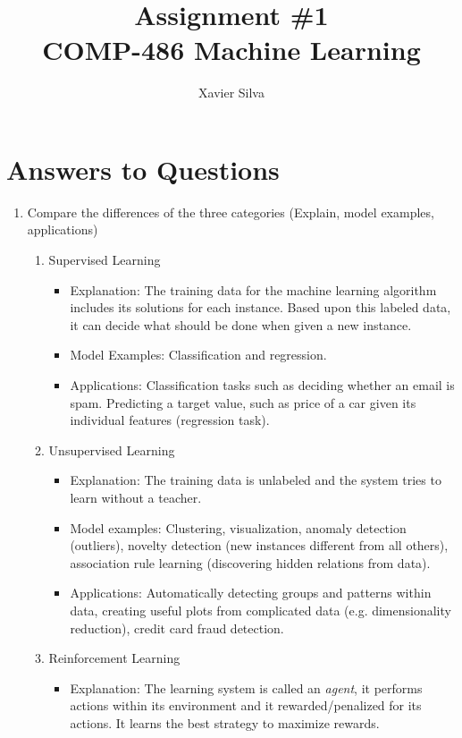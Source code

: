 \documentclass[a4paper,10pt]{article}
\title{Assignment \#1 \\ \large COMP-486 Machine Learning}
\author{Xavier Silva}
\begin{document}
\maketitle
\section*{Answers to Questions}
\begin{enumerate}
	\item Compare the differences of the three categories (Explain, model examples, applications)
	\begin{enumerate}
		\item Supervised Learning
		\begin{itemize}
			\item Explanation:
			The training data for the machine learning algorithm includes its solutions for each instance.
			Based upon this labeled data, it can decide what should be done when given a new instance.
			\item Model Examples:
			Classification and regression.
			\item Applications:
			Classification tasks such as deciding whether an email is spam.
			Predicting a target value, such as price of a car given its individual features (regression task).
		\end{itemize}
		\item Unsupervised Learning
		\begin{itemize}
			\item Explanation:
			The training data is unlabeled and the system tries to learn without a teacher.
			\item Model examples:
			Clustering, visualization, anomaly detection (outliers), novelty detection (new instances different from all others), association rule learning (discovering hidden relations from data).
			\item Applications:
			Automatically detecting groups and patterns within data, creating useful plots from complicated data (e.g. dimensionality reduction), credit card fraud detection.
		\end{itemize}
		\item Reinforcement Learning
		\begin{itemize}
			\item Explanation:
			The learning system is called an \emph{agent}, it performs actions within its environment and it rewarded/penalized for its actions.
			It learns the best strategy to maximize rewards.

\end{itemize}
\end{enumerate}
\end{enumerate}
\end{document}
